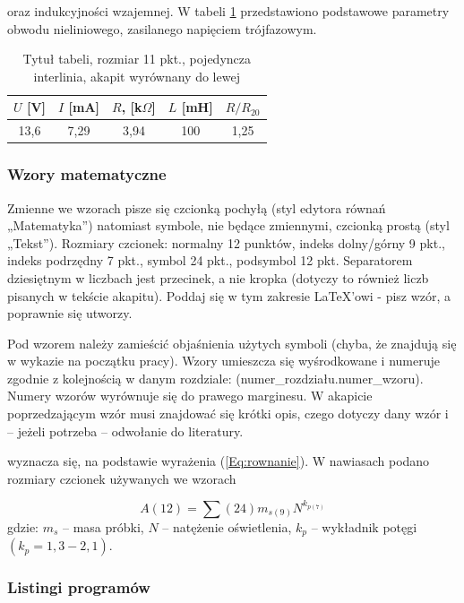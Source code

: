 \documentclass[12pt,twoside]{article}
\begin{document}
\begin{example}
[\ldots] oraz indukcyjności wzajemnej. W tabeli \ref{Tab:tabela} przedstawiono podstawowe parametry obwodu nieliniowego, zasilanego napięciem trójfazowym.
\end{example}

\begin{table}[ht]
\caption{Tytuł tabeli, rozmiar 11 pkt., pojedyncza interlinia, akapit wyrównany do lewej}
\centering		
	\begin{tabular}{|c|c|c|c|c|}	
		\hline
		$U$ [V] & $I$ [mA] & $R$, [k$\Omega$] & $L$ [mH] & $R/R_{20}$ \\
		\hline
		13,6 & 7,29 & 3,94 & 100 & 1,25 \\
		\hline
	\end{tabular}	
	
\label{Tab:tabela}
\end{table}	

{\subsubsection{Wzory matematyczne}}

Zmienne we wzorach pisze się czcionką pochyłą (styl edytora równań „Matematyka”) natomiast symbole, nie będące zmiennymi, czcionką prostą (styl „Tekst”).
Rozmiary czcionek: normalny 12 punktów, indeks dolny/górny 9 pkt., indeks podrzędny 7 pkt., symbol 24 pkt., podsymbol 12 pkt. Separatorem dziesiętnym w liczbach jest
przecinek, a nie kropka (dotyczy to również liczb pisanych w tekście akapitu). Poddaj się w tym zakresie \LaTeX'owi - pisz wzór, a poprawnie się utworzy.


Pod wzorem należy zamieścić objaśnienia użytych symboli (chyba, że znajdują się w wykazie na początku pracy). Wzory umieszcza się wyśrodkowane i numeruje zgodnie
z kolejnością w danym rozdziale: (numer\_rozdziału.numer\_wzoru). Numery wzorów wyrównuje się do prawego marginesu. W akapicie poprzedzającym wzór musi znajdować się krótki opis, czego dotyczy dany wzór i – jeżeli potrzeba – odwołanie do literatury.

\begin{example}
[\ldots] wyznacza się, na podstawie wyrażenia (\ref{Eq:rownanie}). W nawiasach podano rozmiary czcionek używanych we wzorach
\end{example}

\begin{equation}
A(12)={\sum}(24)m_{s(9)}N^{k_{p(7)}}
\label{Eq:rownanie}
\end{equation}
gdzie: $m_s$ -- masa próbki, $N$ -- natężenie oświetlenia, $k_p$ -- wykładnik potęgi $(k_p=1,3-2,1)$.\\
\newpage
{\subsubsection{Listingi programów}}
\end{document}
